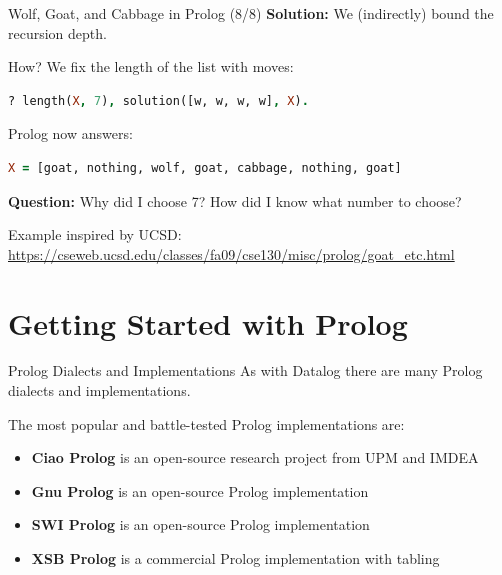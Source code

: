\begin{frame}[fragile]{Wolf, Goat, and Cabbage in Prolog (8/8)}
\textbf{Solution:} We (indirectly) bound the recursion depth.

\pause

How? We fix the length of the list with moves:

\begin{lstlisting}[language=prolog, xleftmargin=0.5cm]
? length(X, 7), solution([w, w, w, w], X).
\end{lstlisting}

\pause

Prolog now answers:

\begin{lstlisting}[language=prolog, xleftmargin=0.5cm]
X = [goat, nothing, wolf, goat, cabbage, nothing, goat]
\end{lstlisting}

\pause

\textbf{Question:} Why did I choose 7? How did I know what number to choose?

\pause

\bigskip 
\scriptsize
Example inspired by UCSD: {\tiny \url{https://cseweb.ucsd.edu/classes/fa09/cse130/misc/prolog/goat_etc.html}}
\end{frame}

\section{Getting Started with Prolog}

\begin{frame}{Prolog Dialects and Implementations}
As with Datalog there are many Prolog dialects and implementations.

The most popular and battle-tested Prolog implementations are:

\begin{itemize}
    \item \textbf{Ciao Prolog} is an open-source research project from UPM and IMDEA 
    \item \textbf{Gnu Prolog} is an open-source Prolog implementation 
    \item \textbf{SWI Prolog} is an open-source Prolog implementation 
    \item \textbf{XSB Prolog} is a commercial Prolog implementation with tabling
\end{itemize}
\end{frame}

